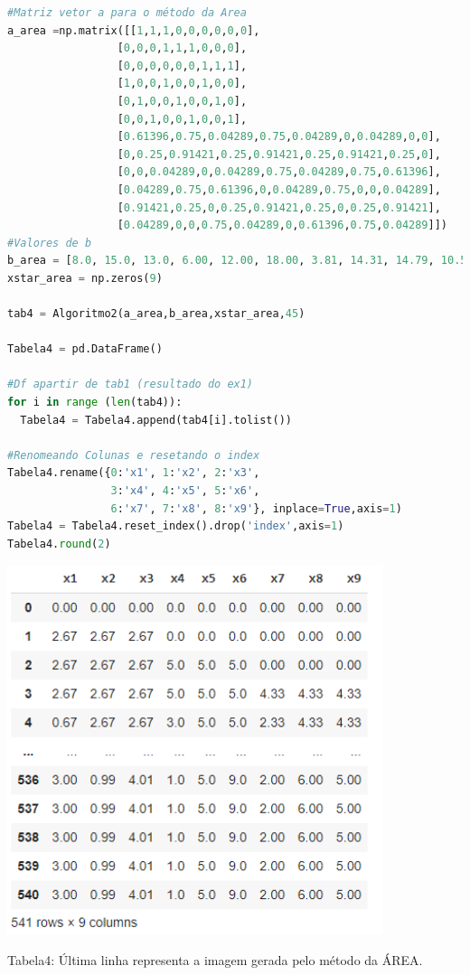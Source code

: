 \documentclass[a4paper, 12pt]{article}
\begin{document}
\begin{lstlisting}[language=Python, caption=Método da reta central: construindo a imagem, label=Método da reta central: construindo a imagem]
#Matriz vetor a para o método da Area
a_area =np.matrix([[1,1,1,0,0,0,0,0,0],
                 [0,0,0,1,1,1,0,0,0],
                 [0,0,0,0,0,0,1,1,1],
                 [1,0,0,1,0,0,1,0,0],
                 [0,1,0,0,1,0,0,1,0],
                 [0,0,1,0,0,1,0,0,1],
                 [0.61396,0.75,0.04289,0.75,0.04289,0,0.04289,0,0],
                 [0,0.25,0.91421,0.25,0.91421,0.25,0.91421,0.25,0],
                 [0,0,0.04289,0,0.04289,0.75,0.04289,0.75,0.61396],
                 [0.04289,0.75,0.61396,0,0.04289,0.75,0,0,0.04289],
                 [0.91421,0.25,0,0.25,0.91421,0.25,0,0.25,0.91421],
                 [0.04289,0,0,0.75,0.04289,0,0.61396,0.75,0.04289]])
#Valores de b
b_area = [8.0, 15.0, 13.0, 6.00, 12.00, 18.00, 3.81, 14.31, 14.79, 10.51, 16.13, 7.04]
xstar_area = np.zeros(9)

tab4 = Algoritmo2(a_area,b_area,xstar_area,45)

Tabela4 = pd.DataFrame()

#Df apartir de tab1 (resultado do ex1)
for i in range (len(tab4)):
  Tabela4 = Tabela4.append(tab4[i].tolist())

#Renomeando Colunas e resetando o index
Tabela4.rename({0:'x1', 1:'x2', 2:'x3', 
                3:'x4', 4:'x5', 5:'x6',
                6:'x7', 7:'x8', 8:'x9'}, inplace=True,axis=1)
Tabela4 = Tabela4.reset_index().drop('index',axis=1)
Tabela4.round(2)
\end{lstlisting}

\begin{center}
\includegraphics[width=11cm]{111_saida_tabela_4.PNG}

Tabela4: Última linha representa a imagem gerada pelo método da ÁREA.   

\end{center}
\end{document}
